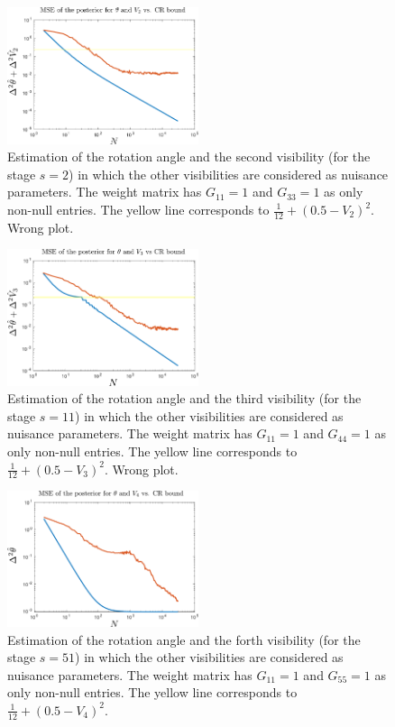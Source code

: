\documentclass[aps, pra, 10pt, twocolumn, superscriptaddress,floatfix]{revtex4-1}
\begin{document}
\begin{figure}[!t]
	\begin{center}
		\includegraphics[width=0.5\textwidth]{thetaV2.pdf}
	\end{center}
	\caption{Estimation of the rotation angle and the second visibility (for the stage $s=2$) in which the other visibilities are considered as nuisance parameters. The weight matrix has $G_{11} = 1$ and $G_{33} = 1$ as only non-null entries. The yellow line corresponds to $\frac{1}{12} + (0.5 - V_2)^2$. {\color{red} Wrong plot.}}
	\label{fig:thetaV2}
\end{figure}
%
\begin{figure}[!t]
	\begin{center}
		\includegraphics[width=0.5\textwidth]{thetaV3.pdf}
	\end{center}
	\caption{Estimation of the rotation angle and the third visibility (for the stage $s=11$) in which the other visibilities are considered as nuisance parameters. The weight matrix has $G_{11} = 1$ and $G_{44} = 1$ as only non-null entries. The yellow line corresponds to $\frac{1}{12} + (0.5 - V_3)^2$. {\color{red} Wrong plot.}}
	\label{fig:thetaV3}
\end{figure}
%
\begin{figure}[!t]
	\begin{center}
		\includegraphics[width=0.5\textwidth]{thetaV4.pdf}
	\end{center}
	\caption{Estimation of the rotation angle and the forth visibility (for the stage $s=51$) in which the other visibilities are considered as nuisance parameters. The weight matrix has $G_{11} = 1$ and $G_{55} = 1$ as only non-null entries. The yellow line corresponds to $\frac{1}{12} + (0.5 - V_4)^2$.}
	\label{fig:thetaV4}
\end{figure}
\end{document}
